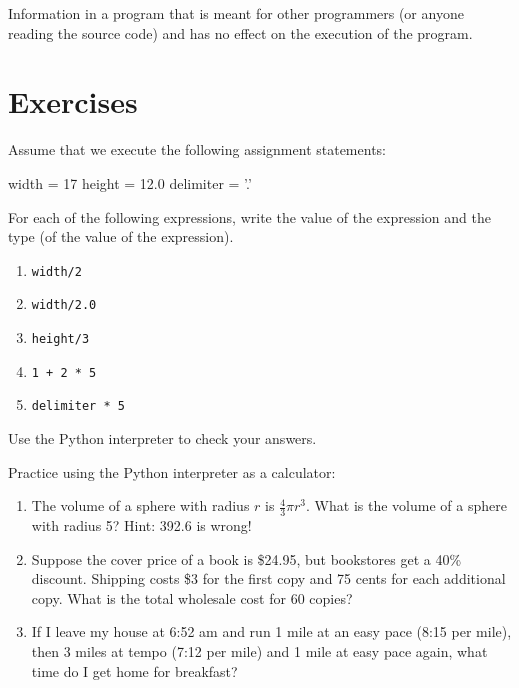 \begin{vocabulary}[comment:]  Information in a program that is meant for other
programmers (or anyone reading the source code) and has no effect on the
execution of the program.
\end{vocabulary}
	

\section{Exercises}

\begin{exercise}
Assume that we execute the following assignment statements:

\begin{pyexo}
width = 17
height = 12.0
delimiter = '.'
\end{pyexo}

For each of the following expressions, write the value of the
expression and the type (of the value of the expression).

\begin{enumerate}

\item {\tt width/2}

\item {\tt width/2.0}

\item {\tt height/3}

\item {\tt 1 + 2 * 5}

\item {\tt delimiter * 5}

\end{enumerate}

Use the Python interpreter to check your answers.
\end{exercise}

\begin{exercise}
Practice using the Python interpreter as a calculator: 

\begin{enumerate}

\item The volume of a sphere with radius $r$ is $\frac{4}{3} \pi r^3$.
  What is the volume of a sphere with radius 5?  Hint: 392.6 is wrong!

\item Suppose the cover price of a book is \$24.95, but bookstores get a
  40\% discount.  Shipping costs \$3 for the first copy and 75 cents
  for each additional copy.  What is the total wholesale cost for
  60 copies?

\item If I leave my house at 6:52 am and run 1 mile at an easy pace
  (8:15 per mile), then 3 miles at tempo (7:12 per mile) and 1 mile at
  easy pace again, what time do I get home for breakfast?


\end{enumerate}
\end{exercise}
